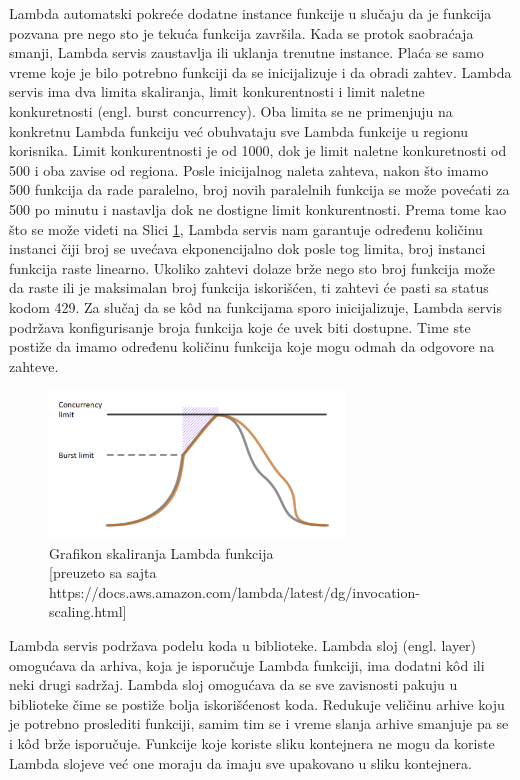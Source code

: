 \documentclass[12pt,oneside]{memoir}
\begin{document}
Lambda automatski pokreće dodatne instance funkcije u slučaju da je funkcija pozvana pre nego sto je tekuća funkcija završila. Kada se protok saobraćaja smanji, Lambda servis zaustavlja ili uklanja trenutne instance. Plaća se samo vreme koje je bilo potrebno funkciji da se inicijalizuje i da obradi zahtev. Lambda servis ima dva limita skaliranja, limit konkurentnosti i limit naletne konkuretnosti (engl. burst concurrency). Oba limita se ne primenjuju na konkretnu Lambda funkciju već obuhvataju sve Lambda funkcije u regionu korisnika. Limit konkurentnosti je od 1000, dok je limit naletne konkuretnosti od 500 i oba zavise od regiona. Posle inicijalnog naleta zahteva, nakon što imamo 500 funkcija da rade paralelno, broj novih paralelnih funkcija se može povećati za 500 po minutu i nastavlja dok ne dostigne limit konkurentnosti. Prema tome kao što se može videti na Slici \ref{fig:awsLambdaSkaliranje}, Lambda servis nam garantuje određenu količinu instanci čiji broj se uvećava ekponencijalno dok posle tog limita, broj instanci funkcija raste linearno. Ukoliko zahtevi dolaze brže nego sto broj funkcija može da raste ili je maksimalan broj funkcija iskorišćen, ti zahtevi će pasti sa status kodom 429. Za slučaj da se kôd na funkcijama sporo inicijalizuje, Lambda servis podržava konfigurisanje broja funkcija koje će uvek biti dostupne. Time ste postiže da imamo određenu količinu funkcija koje mogu odmah da odgovore na zahteve.
 

\begin{figure}[!ht]
  \centering
  \includegraphics[width=0.7\textwidth]{AWS-Lambda-skaliranje.png}
  \caption{Grafikon skaliranja Lambda funkcija\\\footnotesize[preuzeto sa sajta https://docs.aws.amazon.com/lambda/latest/dg/invocation-scaling.html]}
  \label{fig:awsLambdaSkaliranje}
\end{figure}
 
Lambda servis podržava podelu koda u biblioteke. Lambda sloj (engl. layer) omogućava da arhiva, koja je isporučuje Lambda funkciji, ima dodatni kôd ili neki drugi sadržaj. Lambda sloj omogućava da se sve zavisnosti pakuju u biblioteke čime se postiže bolja iskorišćenost koda. Redukuje veličinu arhive koju je potrebno proslediti funkciji, samim tim se i vreme slanja arhive smanjuje pa se i kôd brže isporučuje. Funkcije koje koriste sliku kontejnera ne mogu da koriste Lambda slojeve već one moraju da imaju sve upakovano u sliku kontejnera.
\end{document}
